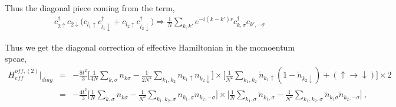 \documentclass[reprint,prb,superscriptaddress]{revtex4-1}
\begin{document}
Thus the diagonal piece coming from the term,
\begin{eqnarray}
&& c_{2\uparrow}^{\dagger}c_{2\downarrow} \bigg(  c_{l_1\uparrow}c_{l_1\downarrow}^{\dagger} +  c_{l_2\uparrow}c_{l_2\downarrow}^{\dagger} \bigg)\Rightarrow \frac{1}{N} \displaystyle\sum_{k,k'} e^{-i(k-k')r} c_{k,\sigma}^{\dagger} c_{k',-\sigma}  \nonumber
\end{eqnarray}
\begin{widetext}
Thus we get the diagonal correction of effective Hamiltonian in the momoentum spcae,
\begin{eqnarray}
H_{eff}^{off,(2)} \bigg|_{diag} &=& -\frac{8t^2}{3} \bigg[ \frac{1}{4N} \displaystyle\sum_{k,\sigma} n_{k\sigma}-\frac{1}{2N^2} \displaystyle\sum_{k_1,k_2} n_{k_1\uparrow} n_{k_2\downarrow} \bigg] \times \bigg[\frac{1}{N^2} \displaystyle\sum_{k_1,k_2} \tilde{n}_{k_1\uparrow}(1-\tilde{n}_{k_2\downarrow}) + (\uparrow \rightarrow \downarrow)\bigg] \times 2 \nonumber\\
&=& -\frac{4t^2}{3} \bigg[ \frac{1}{N} \displaystyle\sum_{k,\sigma} n_{k\sigma}-\frac{1}{N^2} \displaystyle\sum_{k_1,k_2,\sigma} n_{k_1,\sigma} n_{k_2,-\sigma} \bigg] \times \bigg[\frac{1}{N} \displaystyle\sum_{k_1,\sigma} \tilde{n}_{k_1,\sigma} -  \frac{1}{N^2} \displaystyle\sum_{k_1,k_2,\sigma} \tilde{n}_{k_1\sigma}\tilde{n}_{k_2,-\sigma}\bigg]~,~~~~ 
\end{eqnarray}
%
%


\end{widetext}
\end{document}
